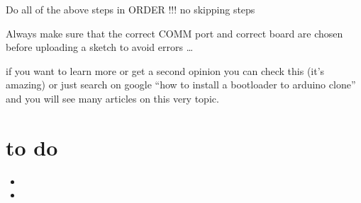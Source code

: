 Do all of the above steps in ORDER !!! no skipping steps

\bigskip

Always make sure that the correct COMM port and correct board are chosen before uploading a sketch to avoid errors \ldots

\bigskip

if you want to learn more or get a second opinion you can check this  (it's amazing) or just search on google ``how to install a bootloader to arduino clone'' and you will see many articles on this very topic.

\section{to do}

\begin{itemize}
  \item {}
  \item {}
\end{itemize}
